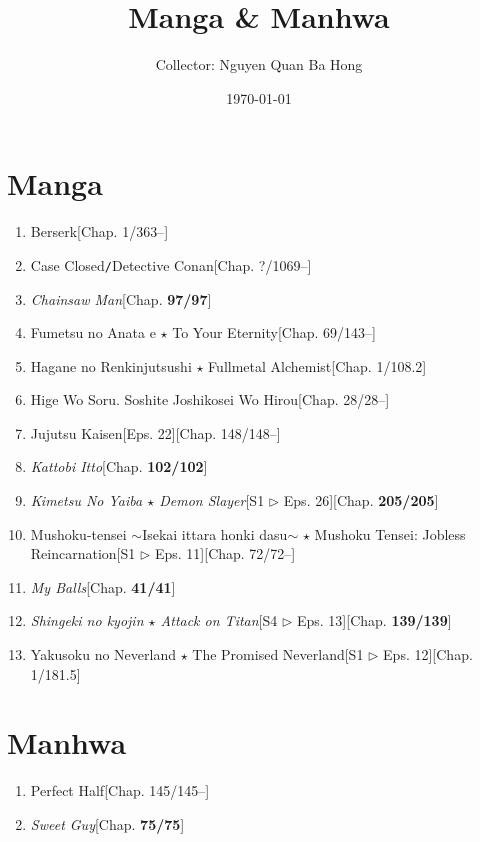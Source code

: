 \documentclass{article}
\title{Manga {\large\&} Manhwa}
\author{Collector: Nguyen Quan Ba Hong}
\date{\today}
\numberwithin{equation}{section}
\begin{document}
\maketitle
\setcounter{secnumdepth}{6}
\setcounter{tocdepth}{6}
\tableofcontents


\section{Manga}

\begin{enumerate}
    \item Berserk\hfill[Chap. 1/363--]
    \item Case Closed\texttt{/}Detective Conan\hfill[Chap. ?/1069--]
    \item \textit{Chainsaw Man}\hfill[Chap. \textbf{97/97}]
    \item Fumetsu no Anata e $\star$ To Your Eternity\hfill[Chap. 69/143--]
    \item Hagane no Renkinjutsushi $\star$ Fullmetal Alchemist\hfill[Chap. 1/108.2]
    \item Hige Wo Soru. Soshite Joshikosei Wo Hirou\hfill[Chap. 28/28--]
    \item Jujutsu Kaisen\hfill[Eps. 22][Chap. 148/148--]
    \item \textit{Kattobi Itto}\hfill[Chap. \textbf{102/102}]
    \item \textit{Kimetsu No Yaiba $\star$ Demon Slayer}\hfill[S1 $\triangleright$ Eps. 26][Chap. \textbf{205/205}]
    \item Mushoku-tensei $\sim$Isekai ittara honki dasu$\sim$ $\star$ Mushoku Tensei: Jobless Reincarnation\hfill[S1 $\triangleright$ Eps. 11][Chap. 72/72--]
    \item \textit{My Balls}\hfill[Chap. \textbf{41/41}]
    \item \textit{Shingeki no kyojin $\star$ Attack on Titan}\hfill[S4 $\triangleright$ Eps. 13][Chap. \textbf{139/139}]
    \item Yakusoku no Neverland $\star$ The Promised Neverland\hfill[S1 $\triangleright$ Eps. 12][Chap. 1/181.5]
\end{enumerate}


\section{Manhwa}

\begin{enumerate}
    \item Perfect Half\hfill[Chap. 145/145--]
    \item \textit{Sweet Guy}\hfill[Chap. \textbf{75/75}]
\end{enumerate}

\end{document}
